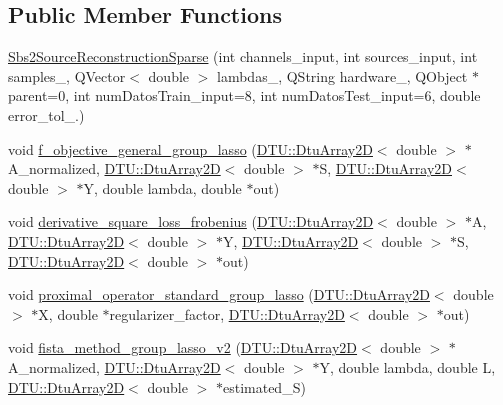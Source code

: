 \subsection*{Public Member Functions}
\begin{DoxyCompactItemize}
\item 
\hyperlink{classSbs2SourceReconstructionSparse_ab51a1e6f1836882079c63792d79b475a}{Sbs2\-Source\-Reconstruction\-Sparse} (int channels\-\_\-input, int sources\-\_\-input, int samples\-\_\-, Q\-Vector$<$ double $>$ lambdas\-\_\-, Q\-String hardware\-\_\-, Q\-Object $\ast$parent=0, int num\-Datos\-Train\-\_\-input=8, int num\-Datos\-Test\-\_\-input=6, double error\-\_\-tol\-\_.)
\item 
void \hyperlink{classSbs2SourceReconstructionSparse_a7ce38152947515d6823d27366d708e58}{f\-\_\-objective\-\_\-general\-\_\-group\-\_\-lasso} (\hyperlink{classDTU_1_1DtuArray2D}{D\-T\-U\-::\-Dtu\-Array2\-D}$<$ double $>$ $\ast$A\-\_\-normalized, \hyperlink{classDTU_1_1DtuArray2D}{D\-T\-U\-::\-Dtu\-Array2\-D}$<$ double $>$ $\ast$S, \hyperlink{classDTU_1_1DtuArray2D}{D\-T\-U\-::\-Dtu\-Array2\-D}$<$ double $>$ $\ast$Y, double lambda, double $\ast$out)
\item 
void \hyperlink{classSbs2SourceReconstructionSparse_a37faa1ccf1cd9e4f5c505291b01679e3}{derivative\-\_\-square\-\_\-loss\-\_\-frobenius} (\hyperlink{classDTU_1_1DtuArray2D}{D\-T\-U\-::\-Dtu\-Array2\-D}$<$ double $>$ $\ast$A, \hyperlink{classDTU_1_1DtuArray2D}{D\-T\-U\-::\-Dtu\-Array2\-D}$<$ double $>$ $\ast$Y, \hyperlink{classDTU_1_1DtuArray2D}{D\-T\-U\-::\-Dtu\-Array2\-D}$<$ double $>$ $\ast$S, \hyperlink{classDTU_1_1DtuArray2D}{D\-T\-U\-::\-Dtu\-Array2\-D}$<$ double $>$ $\ast$out)
\item 
void \hyperlink{classSbs2SourceReconstructionSparse_ab65afe0fe91f8f79bfcfeb678b4dedfa}{proximal\-\_\-operator\-\_\-standard\-\_\-group\-\_\-lasso} (\hyperlink{classDTU_1_1DtuArray2D}{D\-T\-U\-::\-Dtu\-Array2\-D}$<$ double $>$ $\ast$X, double $\ast$regularizer\-\_\-factor, \hyperlink{classDTU_1_1DtuArray2D}{D\-T\-U\-::\-Dtu\-Array2\-D}$<$ double $>$ $\ast$out)
\item 
void \hyperlink{classSbs2SourceReconstructionSparse_a305baa833a5487152f006781ae563ec9}{fista\-\_\-method\-\_\-group\-\_\-lasso\-\_\-v2} (\hyperlink{classDTU_1_1DtuArray2D}{D\-T\-U\-::\-Dtu\-Array2\-D}$<$ double $>$ $\ast$A\-\_\-normalized, \hyperlink{classDTU_1_1DtuArray2D}{D\-T\-U\-::\-Dtu\-Array2\-D}$<$ double $>$ $\ast$Y, double lambda, double L, \hyperlink{classDTU_1_1DtuArray2D}{D\-T\-U\-::\-Dtu\-Array2\-D}$<$ double $>$ $\ast$estimated\-\_\-\-S)

\end{DoxyCompactItemize}
